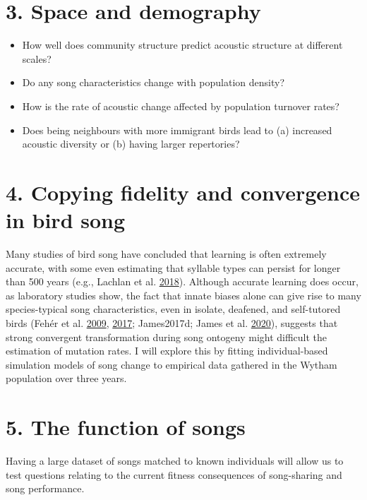 \documentclass[]{report}
\providecommand{\tightlist}{%
  \setlength{\itemsep}{0pt}\setlength{\parskip}{0pt}}
\begin{document}
\hypertarget{space-and-demography}{%
\section{3. Space and demography}\label{space-and-demography}}

\begin{itemize}
\tightlist
\item
  How well does community structure predict acoustic structure at
  different scales?
\item
  Do any song characteristics change with population density?
\item
  How is the rate of acoustic change affected by population turnover
  rates?
\item
  Does being neighbours with more immigrant birds lead to (a) increased
  acoustic diversity or (b) having larger repertories?
\end{itemize}

\hypertarget{copying-fidelity-and-convergence-in-bird-song}{%
\section{4. Copying fidelity and convergence in bird
song}\label{copying-fidelity-and-convergence-in-bird-song}}

Many studies of bird song have concluded that learning is often
extremely accurate, with some even estimating that syllable types can
persist for longer than 500 years (e.g., Lachlan et al.
\protect\hyperlink{ref-Lachlan2018b}{2018}). Although accurate learning
does occur, as laboratory studies show, the fact that innate biases
alone can give rise to many species-typical song characteristics, even
in isolate, deafened, and self-tutored birds (Fehér et al.
\protect\hyperlink{ref-Feher2009}{2009},
\protect\hyperlink{ref-Feher2017}{2017}; James2017d; James et al.
\protect\hyperlink{ref-James2020}{2020}), suggests that strong
convergent transformation during song ontogeny might difficult the
estimation of mutation rates. I will explore this by fitting
individual-based simulation models of song change to empirical data
gathered in the Wytham population over three years.

\hypertarget{the-function-of-songs}{%
\section{5. The function of songs}\label{the-function-of-songs}}

Having a large dataset of songs matched to known individuals will allow
us to test questions relating to the current fitness consequences of
song-sharing and song performance.
\end{document}
